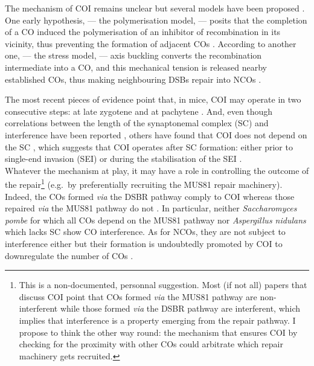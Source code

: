 The mechanism of COI remains unclear but several models have been proposed \citep[reviewed in][]{youds2011choice}.
One early hypothesis, — the polymerisation model, — posits that the completion of a CO induced the polymerisation of an inhibitor of recombination in its vicinity, thus preventing the formation of adjacent COs \citep{maguire1988crossover,king1990polymerization}.
According to another one, — the stress model, — axis buckling converts the recombination intermediate into a CO, and this mechanical tension is released nearby established COs, thus making neighbouring DSBs repair into NCOs \citep{borner2004crossover,kleckner2004mechanical}.

The most recent pieces of evidence point that, in mice, COI may operate in two consecutive steps: at late zygotene and at pachytene \citep{boer2006two}.
And, even though correlations between the length of the synaptonemal complex (SC) and interference have been reported \citep{sym1994crossover,lynn2002covariation,petkov2007crossover}, others have found that COI does not depend on the SC \citep{deboer2007meiotic,shodhan2014msh4}, which suggests that COI operates after SC formation: either prior to single-end invasion (SEI) \citep{hunter2001singleend, bishop2004early} or during the stabilisation of the SEI \citep{shinohara2008crossover}.\\

Whatever the mechanism at play, it may have a role in controlling the outcome of the repair\footnote{This is a non-documented, personnal suggestion. Most (if not all) papers that discuss COI point that COs formed \textit{via} the MUS81 pathway are non-interferent while those formed \textit{via} the DSBR pathway are interferent, which implies that interference is a property emerging from the repair pathway. I propose to think the other way round: the mechanism that ensures COI by checking for the proximity with other COs could arbitrate which repair machinery gets recruited.} (e.g.\ by preferentially recruiting the MUS81 repair machinery).
Indeed, the COs formed \textit{via} the DSBR pathway comply to COI whereas those repaired \textit{via} the MUS81 pathway do not \citep{santos2003mus81,kohl2013meiotic}.
In particular, neither \textit{Saccharomyces pombe} for which all COs depend on the MUS81 pathway \citep{munz1994analysis,hollingsworth2004mus81,cromie2006single} nor \textit{Aspergillus nidulans} which lacks SC \citep[reviewed in \citealp{shaw1998meiosis} and \citealp{egel1995synaptonemal}]{strickland1958analysis} show CO interference.
As for NCOs, they are not subject to interference either \citep{malkova2004gene,baudat2007regulating,miller2016wholegenome} but their formation is undoubtedly promoted by COI to downregulate the number of COs \citep{rockmill2003sgs1,youds2010rtel1,crismani2012fancm,seguela-arnaud2015multiple}.

